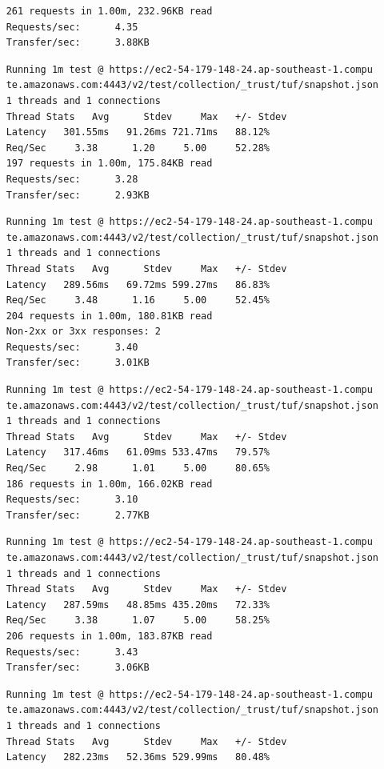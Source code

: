 \documentclass[a4paper,12pt]{article}
\newcounter{subsubsubsection}[subsubsection]
\begin{document}
{{\begin{verbatim}
	261 requests in 1.00m, 232.96KB read
	Requests/sec:      4.35
	Transfer/sec:      3.88KB
	\end{verbatim}
	\newpage
	\begin{verbatim}
	Running 1m test @ https://ec2-54-179-148-24.ap-southeast-1.compu
	te.amazonaws.com:4443/v2/test/collection/_trust/tuf/snapshot.json
	1 threads and 1 connections
	Thread Stats   Avg      Stdev     Max   +/- Stdev
	Latency   301.55ms   91.26ms 721.71ms   88.12%
	Req/Sec     3.38      1.20     5.00     52.28%
	197 requests in 1.00m, 175.84KB read
	Requests/sec:      3.28
	Transfer/sec:      2.93KB
	\end{verbatim}
	\begin{verbatim}
	Running 1m test @ https://ec2-54-179-148-24.ap-southeast-1.compu
	te.amazonaws.com:4443/v2/test/collection/_trust/tuf/snapshot.json
	1 threads and 1 connections
	Thread Stats   Avg      Stdev     Max   +/- Stdev
	Latency   289.56ms   69.72ms 599.27ms   86.83%
	Req/Sec     3.48      1.16     5.00     52.45%
	204 requests in 1.00m, 180.81KB read
	Non-2xx or 3xx responses: 2
	Requests/sec:      3.40
	Transfer/sec:      3.01KB
	\end{verbatim}
	\begin{verbatim}
	Running 1m test @ https://ec2-54-179-148-24.ap-southeast-1.compu
	te.amazonaws.com:4443/v2/test/collection/_trust/tuf/snapshot.json
	1 threads and 1 connections
	Thread Stats   Avg      Stdev     Max   +/- Stdev
	Latency   317.46ms   61.09ms 533.47ms   79.57%
	Req/Sec     2.98      1.01     5.00     80.65%
	186 requests in 1.00m, 166.02KB read
	Requests/sec:      3.10
	Transfer/sec:      2.77KB
	\end{verbatim}
	\begin{verbatim}
	Running 1m test @ https://ec2-54-179-148-24.ap-southeast-1.compu
	te.amazonaws.com:4443/v2/test/collection/_trust/tuf/snapshot.json
	1 threads and 1 connections
	Thread Stats   Avg      Stdev     Max   +/- Stdev
	Latency   287.59ms   48.85ms 435.20ms   72.33%
	Req/Sec     3.38      1.07     5.00     58.25%
	206 requests in 1.00m, 183.87KB read
	Requests/sec:      3.43
	Transfer/sec:      3.06KB
	\end{verbatim}
	\newpage
	\begin{verbatim}
	Running 1m test @ https://ec2-54-179-148-24.ap-southeast-1.compu
	te.amazonaws.com:4443/v2/test/collection/_trust/tuf/snapshot.json
	1 threads and 1 connections
	Thread Stats   Avg      Stdev     Max   +/- Stdev
	Latency   282.23ms   52.36ms 529.99ms   80.48%

\end{verbatim}}}
\end{document}
